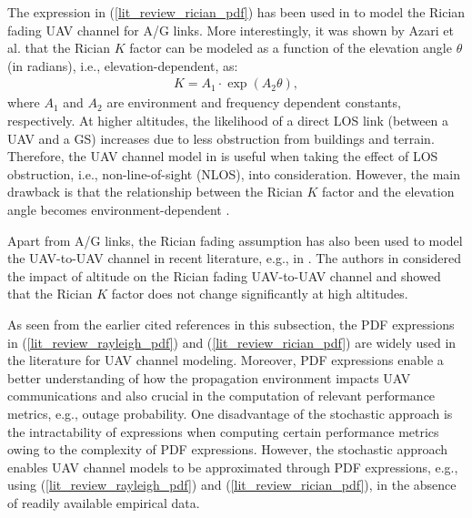 The expression in (\ref{lit_review_rician_pdf}) has been used in \cite{sharma2017uav,ono2016wireless,azari2018ultra,tan2018ricianShad} to model the Rician fading UAV channel for A/G links. More interestingly, it was shown by Azari et al. \cite{azari2018ultra} that the Rician $K$ factor can be modeled as a function of the elevation angle $\theta$ (in radians), i.e., elevation-dependent, as:
\begin{eqnarray} \label{lit_review_rician_k}
K=A_1\cdot\exp\left({A_2\theta}\right),
\end{eqnarray}
where $A_1$ and $A_2$ are environment and frequency dependent constants, respectively. At higher altitudes, the likelihood of a direct LOS link (between a UAV and a GS) increases \cite{azari2018key} due to less obstruction from buildings and terrain. Therefore, the UAV channel model in \cite{azari2018ultra} is useful when taking the effect of LOS obstruction, i.e., non-line-of-sight (NLOS), into consideration. However, the main drawback is that the relationship between the Rician $K$ factor and the elevation angle becomes environment-dependent \cite{azari2018ultra}. 

Apart from A/G links, the Rician fading assumption has also been used to model the UAV-to-UAV channel in recent literature, e.g., in \cite{goddemeier2015investigation,yuan2018capacity}. The authors in \cite{goddemeier2015investigation} considered the impact of altitude on the Rician fading UAV-to-UAV channel and showed that the Rician $K$ factor does not change significantly at high altitudes.
 
As seen from the earlier cited references in this subsection, the PDF expressions in (\ref{lit_review_rayleigh_pdf}) and (\ref{lit_review_rician_pdf}) are widely used in the literature for UAV channel modeling. Moreover, PDF expressions enable a better understanding of how the propagation environment impacts UAV communications and also crucial in the computation of relevant performance metrics, e.g., outage probability. One disadvantage of the stochastic approach is the intractability of expressions when computing certain performance metrics owing to the complexity of PDF expressions. However, the stochastic approach enables UAV channel models to be approximated through PDF expressions, e.g., using (\ref{lit_review_rayleigh_pdf}) and (\ref{lit_review_rician_pdf}), in the absence of readily available empirical data.

